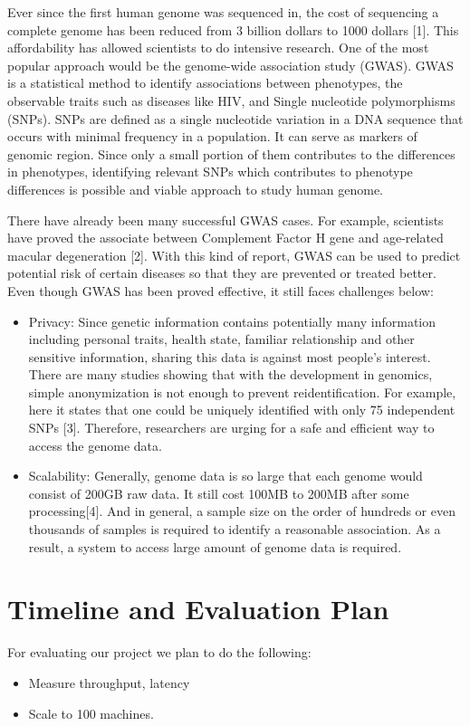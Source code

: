 \documentclass[pdftex,twocolumn,10pt,letterpaper]{article}
\begin{document}
Ever since the first human genome was sequenced in, the cost of sequencing a complete genome has been reduced from 3 billion dollars to 1000 dollars [1]. This affordability has allowed scientists to do intensive research. One of the most popular approach would be the genome-wide association study (GWAS). GWAS is a statistical method to identify associations between phenotypes, the observable traits such as diseases like HIV, and Single nucleotide polymorphisms (SNPs). SNPs are defined as a single nucleotide variation in a DNA sequence that occurs with minimal frequency in a population. It can serve as markers of genomic region. Since only a small portion of them contributes to the differences in phenotypes, identifying relevant SNPs which contributes to phenotype differences is possible and viable approach to study human genome.
\par There have already been many successful GWAS cases. For example, scientists have proved the associate between Complement Factor H gene and age-related macular degeneration [2]. With this kind of report, GWAS can be used to predict potential risk of certain diseases so that they are prevented or treated better.
Even though GWAS has been proved effective, it still faces challenges below:
\begin{itemize}
\item Privacy: Since genetic information contains potentially many information including personal traits, health state, familiar relationship and other sensitive information, sharing this data is against most people's interest. There are many studies showing that with the development in genomics, simple anonymization is not enough to prevent reidentification. For example, here it states that one could be uniquely identified with only 75 independent SNPs [3]. Therefore, researchers are urging for a safe and efficient way to access the genome data.

\item Scalability: Generally, genome data is so large that each genome would consist of 200GB raw data. It still cost 100MB to 200MB after some processing[4]. And in general, a sample size on the order of hundreds or even thousands of samples is required to identify a reasonable association. As a result, a system to access large amount of genome data is required.
\end{itemize}

\section{Timeline and Evaluation Plan}
For evaluating our project we plan to do the following:
\begin{itemize}
  \item Measure throughput, latency 
  \item Scale to 100 machines.
\end{itemize}
\end{document}
